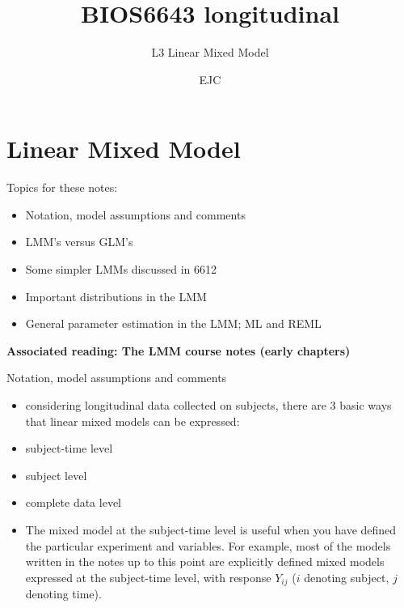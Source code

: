 \documentclass[
  9pt,
  ignorenonframetext,
]{beamer}
\title{BIOS6643 longitudinal}
\subtitle{L3 Linear Mixed Model}
\author{EJC}
\date{}
\institute{Department of Biostatistics \& Informatics}
\begin{document}
\frame{\titlepage}

\begin{frame}[allowframebreaks]
  \tableofcontents[hideallsubsections]
\end{frame}
\hypertarget{linear-mixed-model}{%
\section{Linear Mixed Model}\label{linear-mixed-model}}

\begin{frame}{Topics for these notes:}
\protect\hypertarget{topics-for-these-notes}{}
\begin{itemize}
\item
  Notation, model assumptions and comments
\item
  LMM's versus GLM's
\item
  Some simpler LMMs discussed in 6612
\item
  Important distributions in the LMM
\item
  General parameter estimation in the LMM; ML and REML
\end{itemize}

\textbf{Associated reading: The LMM course notes (early chapters)}
\end{frame}

\begin{frame}{Notation, model assumptions and comments}
\protect\hypertarget{notation-model-assumptions-and-comments}{}
\begin{itemize}
\item
  considering longitudinal data collected on subjects, there are 3 basic
  ways that linear mixed models can be expressed:
\item
  subject-time level
\item
  subject level
\item
  complete data level
\item
  The mixed model at the subject-time level is useful when you have
  defined the particular experiment and variables. For example, most of
  the models written in the notes up to this point are explicitly
  defined mixed models expressed at the subject-time level, with
  response \(Y_{ij}\) (\(i\) denoting subject, \(j\) denoting time).
\end{itemize}
\end{frame}
\end{document}
